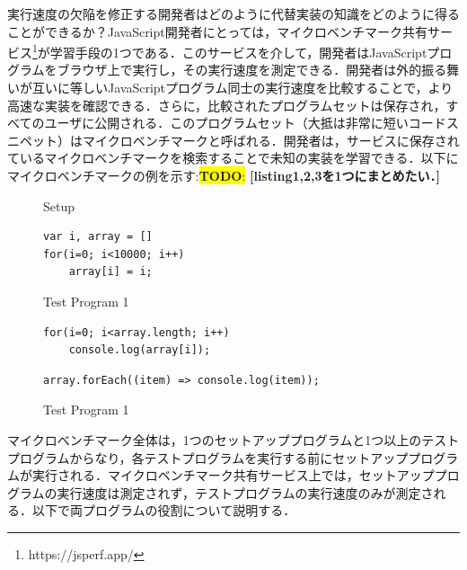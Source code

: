 \documentclass[T,J]{fose} %
\newcommand{\todo}[1]{\colorbox{yellow}{{\bf TODO}:}{\color{red} {\textbf{[#1]}}}}
\begin{document}
実行速度の欠陥を修正する開発者はどのように代替実装の知識をどのように得ることができるか？JavaScript開発者にとっては，マイクロベンチマーク共有サービス\footnote{https://jsperf.app/}が学習手段の1つである．このサービスを介して，開発者はJavaScriptプログラムをブラウザ上で実行し，その実行速度を測定できる．開発者は外的振る舞いが互いに等しいJavaScriptプログラム同士の実行速度を比較することで，より高速な実装を確認できる．さらに，比較されたプログラムセットは保存され，すべてのユーザに公開される．このプログラムセット（大抵は非常に短いコードスニペット）はマイクロベンチマークと呼ばれる．開発者は，サービスに保存されているマイクロベンチマークを検索することで未知の実装を学習できる．以下にマイクロベンチマークの例を示す:\todo{listing1,2,3を1つにまとめたい．}

\begin{figure}[t]
\captionsetup{name=Listing}
  \caption{Setup}\label{setup}
\begin{lstlisting}
var i, array = []
for(i=0; i<10000; i++)
    array[i] = i;
\end{lstlisting}
  \begin{minipage}[b]{0.48\linewidth}
  \caption{Test Program 1}\label{test-a}
\begin{lstlisting}[firstnumber=4]
for(i=0; i<array.length; i++)
    console.log(array[i]);
\end{lstlisting}
  \end{minipage}
    \hspace{0.07\columnwidth} %
  \begin{minipage}[b]{0.48\linewidth}
    \caption{Test Program 1}\label{test-b}
\begin{lstlisting}[firstnumber=4]
array.forEach((item) => console.log(item));
\end{lstlisting}
  \vspace{3.5mm}
  \end{minipage}
\end{figure}

マイクロベンチマーク全体は，1つのセットアッププログラムと1つ以上のテストプログラムからなり，各テストプログラムを実行する前にセットアッププログラムが実行される．マイクロベンチマーク共有サービス上では，セットアッププログラムの実行速度は測定されず，テストプログラムの実行速度のみが測定される．以下で両プログラムの役割について説明する．
\end{document}
